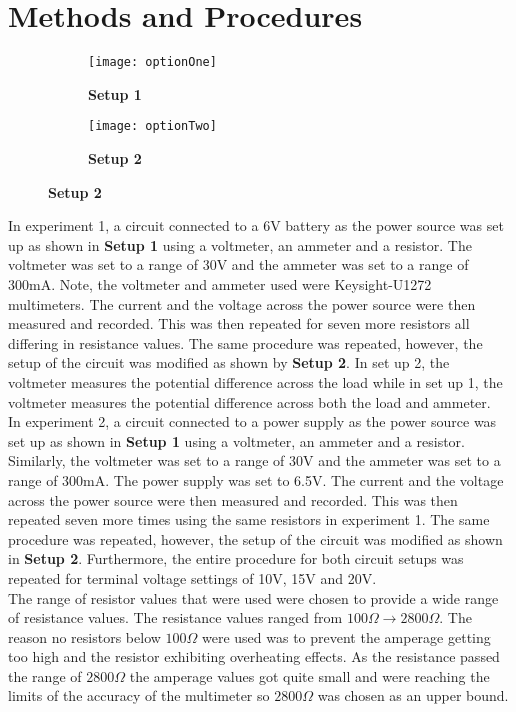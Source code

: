 \documentclass[
	letterpaper, %
	10pt, %
]{CSUniSchoolLabReport}
\begin{document}
\section{Methods and Procedures}
\begin{figure}[H]
    \centering
	\begin{subfigure}{0.45\textwidth}
		\texttt{[image: optionOne]}
		\caption{\textbf{Setup 1}}
	\end{subfigure}
	\begin{subfigure}{0.45\textwidth}
		\texttt{[image: optionTwo]}
		\caption{\textbf{Setup 2}}
	\end{subfigure}
\end{figure}

In experiment 1, a circuit connected to a 6V battery as the power source was set up as shown in \textbf{Setup 1} using a voltmeter, an ammeter and a resistor. The voltmeter was set to a range of 30V and the ammeter was set to a range of 300mA. Note, the voltmeter and ammeter used were Keysight-U1272 multimeters. The current and the voltage across the power source were then measured and recorded. This was then repeated for seven more resistors all differing in resistance values. The same procedure was repeated, however, the setup of the circuit was modified as shown by \textbf{Setup 2}. In set up 2, the voltmeter measures the potential difference across the load while in set up 1, the voltmeter measures the potential difference across both the load and ammeter. \\

In experiment 2, a circuit connected to a power supply as the power source was set up as shown in \textbf{Setup 1} using a voltmeter, an ammeter and a resistor. Similarly, the voltmeter was set to a range of 30V and the ammeter was set to a range of 300mA. The power supply was set to 6.5V. The current and the voltage across the power source were then measured and recorded. This was then repeated seven more times using the same resistors in experiment 1. The same procedure was repeated, however, the setup of the circuit was modified as shown in \textbf{Setup 2}.  Furthermore, the entire procedure for both circuit setups was repeated for terminal voltage settings of 10V, 15V and 20V. \\

The range of resistor values that were used were chosen to provide a wide range of resistance values. The
resistance values ranged from $100\Omega\rightarrow 2800\Omega$. The reason no resistors below $100\Omega$ were used was to prevent the amperage getting
too high and the resistor exhibiting overheating effects. As the resistance passed the range of $2800\Omega$ the
amperage values got quite small and were reaching the limits of the accuracy of the multimeter so $2800\Omega$
was chosen as an upper bound.\\
\newpage
\end{document}
